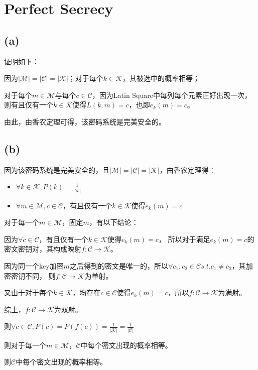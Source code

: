 \documentclass[twoside,11pt]{article}
\begin{document}
\section{Perfect Secrecy}
\subsection*{(a)}
证明如下：

因为$|\mathcal{M}| = |\mathcal{C}| = |\mathcal{K}|$；对于每个$k \in \mathcal{K}$，其被选中的概率相等；

对于每个$m \in \mathcal{M}$与每个$c \in \mathcal{C}$，因为Latin Square中每列每个元素正好出现一次，
则有且仅有一个$k \in \mathcal{K}$使得$L(k,m)=c$，也即$e_k(m) = c$。

由此，由香农定理可得，该密码系统是完美安全的。

\subsection*{(b)}
因为该密码系统是完美安全的，且$|\mathcal{M}| = |\mathcal{C}| = |\mathcal{K}|$，由香农定理得：
\begin{itemize}
    \item $\forall k \in \mathcal{K}, P(k)=\frac{1}{|\mathcal{K}|}$
    \item $\forall m \in \mathcal{M}, c \in \mathcal{C}$，有且仅有一个$k \in \mathcal{K}$使得$e_k(m) = c$
\end{itemize}

对于每一个$m \in \mathcal{M}$，固定$m$，有以下结论：

因为$\forall c \in \mathcal{C}$，有且仅有一个$k \in \mathcal{K}$使得$e_k(m) = c$，
所以对于满足$e_k(m) = c$的密文密钥对，其构成映射$f: \mathcal{C} \to \mathcal{K}$。

因为同一个key加密$m$之后得到的密文是唯一的，所以$\forall c_1, c_2 \in \mathcal{C} s.t. c_1 \ne c_2$，其加密密钥不同，
则$f: \mathcal{C} \to \mathcal{K}$为单射。

又由于对于每个$k \in \mathcal{K}$，均存在$c \in \mathcal{C}$使得$e_k(m) = c$，所以$f: \mathcal{C} \to \mathcal{K}$为满射。

综上，$f: \mathcal{C} \to \mathcal{K}$为双射。

则$\forall c \in \mathcal{C}, P(c)=P(f(c))=\frac{1}{|\mathcal{K}|}=\frac{1}{|\mathcal{C}|}$

则对于每一个$m \in \mathcal{M}$，$\mathcal{C}$中每个密文出现的概率相等。

则$\mathcal{C}$中每个密文出现的概率相等。
\end{document}
